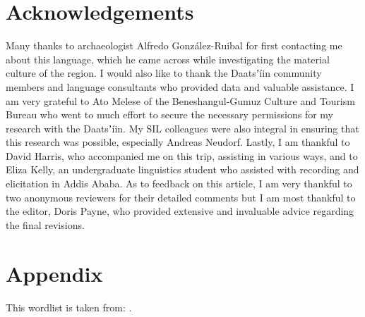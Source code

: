 \documentclass[output=paper]{langsci/langscibook}
\begin{document}
\section*{Acknowledgements}

Many thanks to archaeologist Alfredo Gonz\'{a}lez-Ruibal for first contacting me about this language, which he came across while investigating the material culture of the region. I would also like to thank the Daatsʼ\'{i}in community members and language consultants who provided data and valuable assistance. I am very grateful to Ato Melese of the Beneshangul-Gumuz Culture and Tourism Bureau who went to much effort to secure the necessary permissions for my research with the Daatsʼ\'{i}in. My SIL colleagues were also integral in ensuring that this research was possible, especially Andreas Neudorf. Lastly, I am thankful to David Harris, who accompanied me on this trip, assisting in various ways, and to Eliza Kelly, an undergraduate linguistics student who assisted with recording and elicitation in Addis Ababa. As to feedback on this article, I am very thankful to two anonymous reviewers for their detailed comments but I am most thankful to the editor, Doris Payne, who provided extensive and invaluable advice regarding the final revisions.

\section*{Appendix}

This wordlist is taken from: \citet{HaspelmathTadmor2009}.
\end{document}
